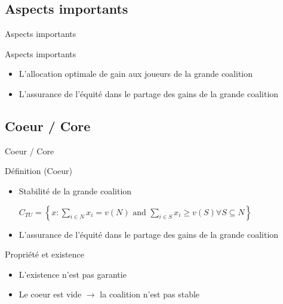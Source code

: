 \documentclass{isimabeamer}
\begin{document}
\subsection{Aspects importants}
\begin{frame}{Aspects importants}
\begin{block}{Aspects importants}
\begin{itemize}
    \item L'allocation optimale de gain aux joueurs de la grande coalition
    \item L'assurance de l'équité dans le partage des gains de la grande coalition
\end{itemize}
\end{block}
\end{frame}

\subsection{Coeur / Core}
\begin{frame}{Coeur / Core}
\begin{block}{Définition (Coeur)}
\begin{itemize}
    \item Stabilité de la grande coalition
    
    $C_{TU} = \left \{ x: \sum_{i \in N} x_i = v (N) \text{ and } \sum_{i \in S} x_i \ge v(S) \forall S \subseteq N \right \}$
    
    \item L'assurance de l'équité dans le partage des gains de la grande coalition
\end{itemize}
\end{block}

\begin{block}{Propriété et existence}
\begin{itemize}
    \item L'existence n'est pas garantie
    \item Le coeur est vide $\rightarrow$ la coalition n'est pas stable    
\end{itemize}
\end{block}

\end{frame}
\end{document}

